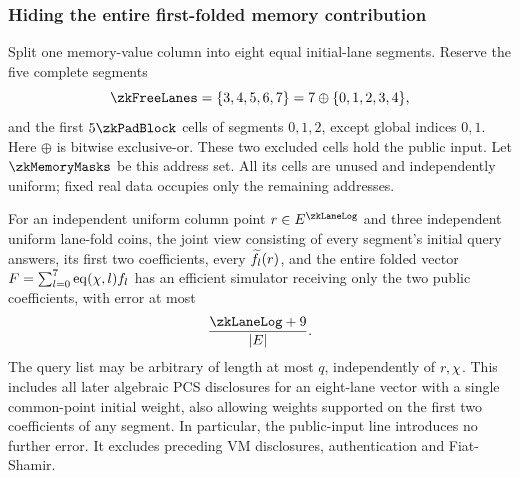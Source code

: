 \subsubsection{Hiding the entire first-folded memory contribution}

Split one memory-value column into eight equal initial-lane segments. Reserve the five complete segments
\[
 \zkFreeLanes=\{3,4,5,6,7\}=7\mathbin{\oplus}\{0,1,2,3,4\},
\]
and the first $5\zkPadBlock$ cells of segments $0,1,2$, except global indices $0,1$. Here $\oplus$ is bitwise exclusive-or. These two excluded cells hold the public input. Let $\zkMemoryMasks$ be this address set. All its cells are unused and independently uniform; fixed real data occupies only the remaining addresses.

\begin{theorem}\label{thm:zk-memory-envelope}
For an independent uniform column point $r\in\E^{\zkLaneLog}$ and three independent uniform lane-fold coins, the joint view consisting of every segment's initial query answers, its first two coefficients, every $\widetilde{f}_l(r)$, and the entire folded vector $F=\sum_{l=0}^7\operatorname{eq}(\chi,l)f_l$ has an efficient simulator receiving only the two public coefficients, with error at most
\[
 \frac{\zkLaneLog+9}{|\E|}.
\]
The query list may be arbitrary of length at most $q$, independently of $r,\chi$. This includes all later algebraic PCS disclosures for an eight-lane vector with a single common-point initial weight, also allowing weights supported on the first two coefficients of any segment. In particular, the public-input line introduces no further error. It excludes preceding VM disclosures, authentication and Fiat-Shamir.
\end{theorem}
